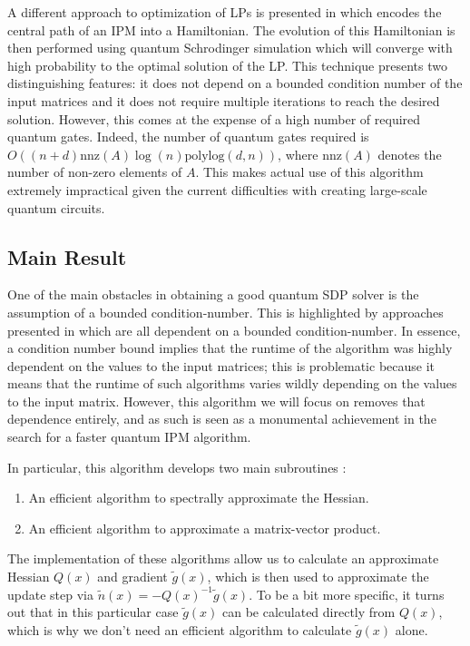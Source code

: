 \documentclass[11pt]{article}
\begin{document}
A different approach to optimization of LPs is presented in \cite{augustinoQuantumCentralPath2023} which encodes the central path of an IPM into a Hamiltonian. The evolution of  this Hamiltonian is then performed using quantum Schrodinger simulation which will converge with high probability to the optimal solution of the LP. This technique presents two distinguishing features: it does not depend on a bounded condition number of the input matrices and it does not require multiple iterations to reach the desired solution. However, this comes at the expense of a high number of required quantum gates. Indeed, the number of quantum gates required is $O((n+d)\text{nnz}(A)\log(n)\text{polylog}(d, n))$, where $\text{nnz}(A)$ denotes the number of non-zero elements of $A$. This makes actual use of this algorithm extremely impractical given the current difficulties with creating large-scale quantum circuits.





 
 
\subsection{Main Result}
\label{Main Result}
One of the main obstacles in obtaining a good quantum SDP solver is the assumption of a bounded condition-number. This is highlighted by approaches presented in \cite{brandaoQuantumSDPSolvers2019, wuInexactFeasibleQuantum2023, huangFasterQuantumAlgorithm2023} which are all dependent on a bounded condition-number. In essence, 
a condition number bound implies that the runtime of the algorithm was highly dependent on the 
values to the input matrices; this is problematic because it means that the runtime of such algorithms 
varies wildly depending on the values to the input matrix. However, this algorithm we will focus on removes 
that dependence entirely, and as such is seen as a monumental achievement in the search for a faster 
quantum IPM algorithm. 

In particular, this algorithm develops two main subroutines \cite{apersQuantumSpeedupsLinear2024}:
\begin{enumerate}[label=\alph*)]
	\item An efficient algorithm to spectrally approximate the Hessian. 
	\item An efficient algorithm to approximate a matrix-vector product. 
\end{enumerate}
The implementation of these algorithms allow us to calculate an approximate Hessian \( Q(x) \) and gradient 
\( \tilde g(x) \), which is then used to approximate the update step via \( \tilde n(x) = -Q(x)^{-1} \tilde g(x) \).
To be a bit more specific, it turns out that in this particular case \( \tilde g(x) \) can be calculated directly 
from \( Q(x) \), which is why we don't need an efficient algorithm to calculate \( \tilde g(x) \) alone. 
\end{document}
